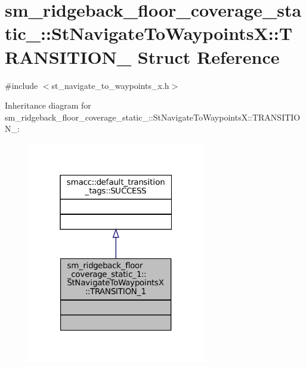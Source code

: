 \hypertarget{structsm__ridgeback__floor__coverage__static__1_1_1StNavigateToWaypointsX_1_1TRANSITION__1}{}\section{sm\+\_\+ridgeback\+\_\+floor\+\_\+coverage\+\_\+static\+\_\+:\+:St\+Navigate\+To\+WaypointsX\+:\+:T\+R\+A\+N\+S\+I\+T\+I\+O\+N\+\_ Struct Reference}
\label{structsm__ridgeback__floor__coverage__static__1_1_1StNavigateToWaypointsX_1_1TRANSITION__1}


{\ttfamily \#include $<$st\+\_\+navigate\+\_\+to\+\_\+waypoints\+\_\+x.\+h$>$}



Inheritance diagram for sm\+\_\+ridgeback\+\_\+floor\+\_\+coverage\+\_\+static\+\_\+:\+:St\+Navigate\+To\+WaypointsX\+:\+:T\+R\+A\+N\+S\+I\+T\+I\+O\+N\+\_\+:
\nopagebreak
\begin{figure}[H]
\begin{center}
\leavevmode
\includegraphics[width=220pt]{structsm__ridgeback__floor__coverage__static__1_1_1StNavigateToWaypointsX_1_1TRANSITION__1__inherit__graph}
\end{center}
\end{figure}


